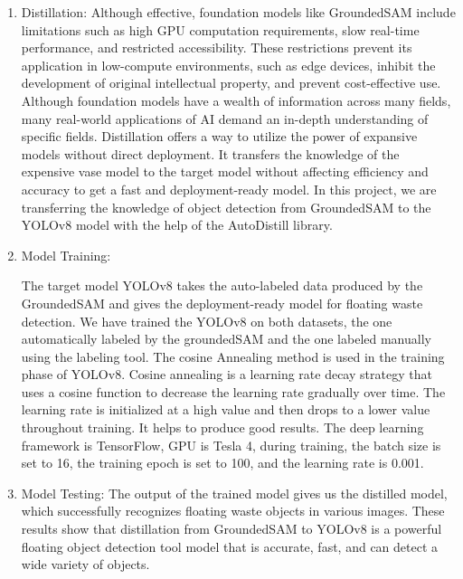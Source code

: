 \begin{enumerate}
\item Distillation:
Although effective, foundation models like GroundedSAM include limitations such as high GPU computation requirements, slow real-time performance, and restricted accessibility. These restrictions prevent its application in low-compute environments, such as edge devices, inhibit the development of original intellectual property, and prevent cost-effective use. Although foundation models have a wealth of information across many fields, many real-world applications of AI demand an in-depth understanding of specific fields. Distillation offers a way to utilize the power of expansive models without direct deployment. It transfers the knowledge of the expensive vase model to the target model without affecting efficiency and accuracy to get a fast and deployment-ready model\cite{Distill}. In this project, we are transferring the knowledge of object detection from GroundedSAM to the YOLOv8 model with the help of the AutoDistill library.


\item Model Training:

The target model YOLOv8 takes the auto-labeled data produced by the GroundedSAM and gives the deployment-ready model for floating waste detection. We have trained the YOLOv8 on both datasets, the one automatically labeled by the groundedSAM and the one labeled manually using the labeling tool.
The cosine Annealing method is used in the training phase of YOLOv8.
Cosine annealing is a learning rate decay strategy that uses a cosine function to decrease the learning rate gradually over time. The learning rate is initialized at a high value and then drops to a lower value throughout training. It helps to produce good results. The deep learning framework is TensorFlow, GPU is Tesla 4, during training, the batch size is set to 16, the training epoch is set to 100, and the learning rate is 0.001. 

\item  
Model Testing: 
The output of the trained model gives us the distilled model, which successfully recognizes floating waste objects in various images. These results show that distillation from GroundedSAM to YOLOv8 is a powerful floating object detection tool model that is accurate, fast, and can detect a wide variety of objects.
\\

\end{enumerate}


